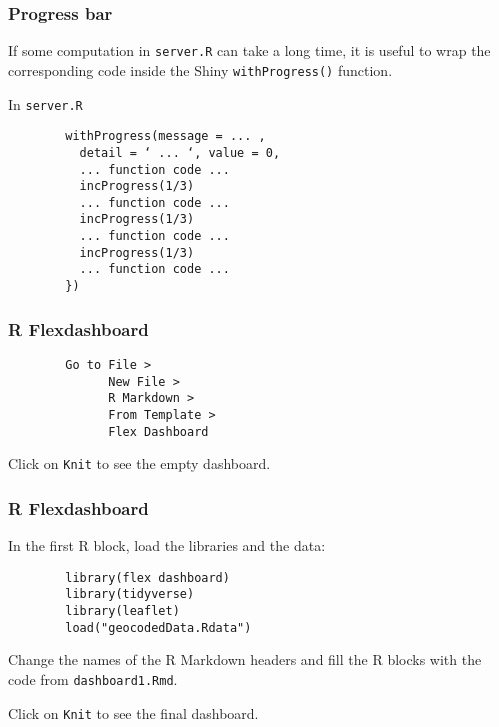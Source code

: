 \documentclass{beamer}
\begin{document}
	\begin{frame}[fragile]
		\frametitle{Progress bar}

		If some computation in \verb|server.R| can take a long time, it is useful to wrap the corresponding code inside the Shiny \verb|withProgress()| function.

		\vspace{1em}

		In \verb|server.R|
		\begin{exampleblock}{}
		\begin{BVerbatim}
		withProgress(message = ... ,
		  detail = ‘ ... ‘, value = 0,
		  ... function code ...
		  incProgress(1/3)
		  ... function code ...
		  incProgress(1/3)
		  ... function code ...
		  incProgress(1/3)
		  ... function code ...
		})
		\end{BVerbatim}
		\end{exampleblock}{}

	\end{frame}

	\begin{frame}[fragile]
		\frametitle{R Flexdashboard}

		\begin{exampleblock}{}
		\begin{BVerbatim}
		Go to File >
		      New File >
		      R Markdown >
		      From Template >
		      Flex Dashboard
		\end{BVerbatim}
		\end{exampleblock}{}

		\vspace{2em}

		Click on \verb|Knit| to see the empty dashboard.
	
	\end{frame}

	\begin{frame}[fragile]
		\frametitle{R Flexdashboard}

		In the first R block, load the libraries and the data:
		
		\begin{exampleblock}{}
		\begin{BVerbatim}
		library(flex dashboard)
		library(tidyverse)
		library(leaflet)
		load("geocodedData.Rdata")
		\end{BVerbatim}
		\end{exampleblock}{}

		\vspace{2em}

		Change the names of the R Markdown headers and fill the R blocks with the code from \verb|dashboard1.Rmd|.

		\vspace{2em}

		Click on \verb|Knit| to see the final dashboard.
	
	\end{frame}
\end{document}
